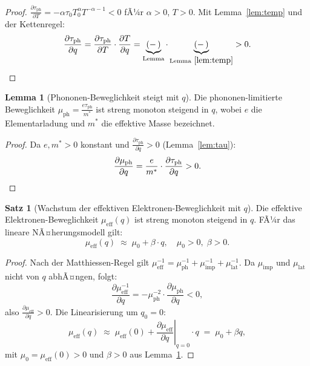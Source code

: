 ﻿\documentclass[a4paper,12pt]{article}
\theoremstyle{definition}
\newtheorem{satz}{Satz}
\newtheorem{lemma}{Lemma}
\begin{document}
\begin{proof}
$\frac{\partial \tau_{\mathrm{ph}}}{\partial T} = -\alpha \tau_0 T_0^\alpha T^{-\alpha-1} < 0$
fÃ¼r $\alpha > 0$, $T > 0$. Mit Lemma~\ref{lem:temp} und der Kettenregel:
\[
\frac{\partial \tau_{\mathrm{ph}}}{\partial q}
= \frac{\partial \tau_{\mathrm{ph}}}{\partial T} \cdot \frac{\partial T}{\partial q}
= \underbrace{(-\,)}_{\text{Lemma}} \cdot \underbrace{(-\,)}_{\text{Lemma}~\ref{lem:temp}} > 0. \qedhere
\]
\end{proof}

\begin{lemma}[Phononen-Beweglichkeit steigt mit $q$]
\label{lem:mu_ph}
Die phononen-limitierte Beweglichkeit
$\mu_{\mathrm{ph}} = \frac{e \tau_{\mathrm{ph}}}{m^*}$ ist streng monoton steigend in $q$,
wobei $e$ die Elementarladung und $m^*$ die effektive Masse bezeichnet.
\end{lemma}

\begin{proof}
Da $e, m^* > 0$ konstant und $\frac{\partial \tau_{\mathrm{ph}}}{\partial q} > 0$
(Lemma~\ref{lem:tau}):
\[
\frac{\partial \mu_{\mathrm{ph}}}{\partial q} = \frac{e}{m^*} \cdot \frac{\partial \tau_{\mathrm{ph}}}{\partial q} > 0. \qedhere
\]
\end{proof}

\begin{satz}[Wachstum der effektiven Elektronen-Beweglichkeit mit $q$]
\label{satz:mu_q}
Die effektive Elektronen-Beweglichkeit $\mu_{\mathrm{eff}}(q)$ ist streng monoton steigend
in $q$. FÃ¼r das lineare NÃ¤herungsmodell gilt:
\[
\mu_{\mathrm{eff}}(q) \;\approx\; \mu_0 + \beta \cdot q, \quad \mu_0 > 0,\; \beta > 0.
\]
\end{satz}

\begin{proof}
Nach der Matthiessen-Regel gilt
$\mu_{\mathrm{eff}}^{-1} = \mu_{\mathrm{ph}}^{-1} + \mu_{\mathrm{imp}}^{-1} + \mu_{\mathrm{lat}}^{-1}$.
Da $\mu_{\mathrm{imp}}$ und $\mu_{\mathrm{lat}}$ nicht von $q$ abhÃ¤ngen, folgt:
\[
\frac{\partial \mu_{\mathrm{eff}}^{-1}}{\partial q}
= -\mu_{\mathrm{ph}}^{-2} \cdot \frac{\partial \mu_{\mathrm{ph}}}{\partial q} < 0,
\]
also $\frac{\partial \mu_{\mathrm{eff}}}{\partial q} > 0$. Die Linearisierung um $q_0 = 0$:
\[
\mu_{\mathrm{eff}}(q) \;\approx\; \mu_{\mathrm{eff}}(0) + \left.\frac{\partial \mu_{\mathrm{eff}}}{\partial q}\right|_{q=0} \cdot q \;=\; \mu_0 + \beta q,
\]
mit $\mu_0 = \mu_{\mathrm{eff}}(0) > 0$ und $\beta > 0$ aus Lemma~\ref{lem:mu_ph}. \qedhere
\end{proof}
\end{document}
